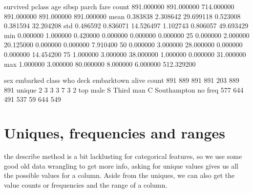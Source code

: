 \documentclass[letterpaper,10pt,english]{jupyterBook}
\begin{document}
\begin{sphinxVerbatim}[commandchars=\\\{\}]
         survived      pclass         age       sibsp       parch        fare
count  891.000000  891.000000  714.000000  891.000000  891.000000  891.000000
mean     0.383838    2.308642   29.699118    0.523008    0.381594   32.204208
std      0.486592    0.836071   14.526497    1.102743    0.806057   49.693429
min      0.000000    1.000000    0.420000    0.000000    0.000000    0.000000
25\PYGZpc{}      0.000000    2.000000   20.125000    0.000000    0.000000    7.910400
50\PYGZpc{}      0.000000    3.000000   28.000000    0.000000    0.000000   14.454200
75\PYGZpc{}      1.000000    3.000000   38.000000    1.000000    0.000000   31.000000
max      1.000000    3.000000   80.000000    8.000000    6.000000  512.329200
\end{sphinxVerbatim}

\begin{sphinxVerbatim}[commandchars=\\\{\}]
\PYG{p}{[} \PYG{p}{]}
\end{sphinxVerbatim}

\begin{sphinxVerbatim}[commandchars=\\\{\}]
         sex embarked  class  who deck  embark\PYGZus{}town alive
count    891      889    891  891  203          889   891
unique     2        3      3    3    7            3     2
top     male        S  Third  man    C  Southampton    no
freq     577      644    491  537   59          644   549
\end{sphinxVerbatim}


\section{Uniques, frequencies and ranges}
\label{\detokenize{c5_data_exploration/variable_identification:uniques-frequencies-and-ranges}}
\sphinxAtStartPar
the describe method is a bit lacklusting for categorical features, so we use some good old data wrangling to get more info, asking for unique values gives us all the possible values for a column. Aside from the uniques, we can also  get the value counts or frequencies and the range of a column.
\end{document}
